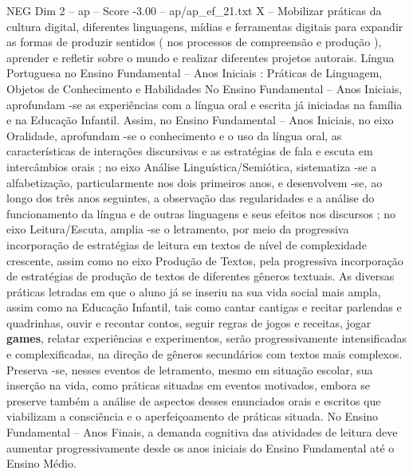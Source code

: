 \begin{textsample}{NEG Dim 2 – ap – Score -3.00 – ap/ap\_ef\_21.txt}
X – Mobilizar práticas da cultura digital, diferentes linguagens, mídias e ferramentas digitais para expandir as formas de produzir sentidos ( nos processos de compreensão e produção ), aprender e refletir sobre o mundo e realizar diferentes projetos autorais.
Língua Portuguesa no Ensino Fundamental – Anos Iniciais : Práticas de Linguagem, Objetos de Conhecimento e Habilidades No Ensino Fundamental – Anos Iniciais, aprofundam -se as experiências com a língua oral e escrita já iniciadas na família e na Educação Infantil.
Assim, no Ensino Fundamental – Anos Iniciais, no eixo Oralidade, aprofundam -se o conhecimento e o uso da língua oral, as características de interações discursivas e as estratégias de fala e escuta em intercâmbios orais ; no eixo Análise Linguística/Semiótica, sistematiza -se a alfabetização, particularmente nos dois primeiros anos, e desenvolvem -se, ao longo dos três anos seguintes, a observação das regularidades e a análise do funcionamento da língua e de outras linguagens e seus efeitos nos discursos ; no eixo Leitura/Escuta, amplia -se o letramento, por meio da progressiva incorporação de estratégias de leitura em textos de nível de complexidade crescente, assim como no eixo Produção de Textos, pela progressiva incorporação de estratégias de produção de textos de diferentes gêneros textuais.
As diversas práticas letradas em que o aluno já se inseriu na sua vida social mais ampla, assim como na Educação Infantil, tais como cantar cantigas e recitar parlendas e quadrinhas, ouvir e recontar contos, seguir regras de jogos e receitas, jogar \textbf{games}, relatar experiências e experimentos, serão progressivamente intensificadas e complexificadas, na direção de gêneros secundários com textos mais complexos.
Preserva -se, nesses eventos de letramento, mesmo em situação escolar, sua inserção na vida, como práticas situadas em eventos motivados, embora se preserve também a análise de aspectos desses enunciados orais e escritos que viabilizam a consciência e o aperfeiçoamento de práticas situada.
No Ensino Fundamental – Anos Finais, a demanda cognitiva das atividades de leitura deve aumentar progressivamente desde os anos iniciais do Ensino Fundamental até o Ensino Médio.

\end{textsample}
